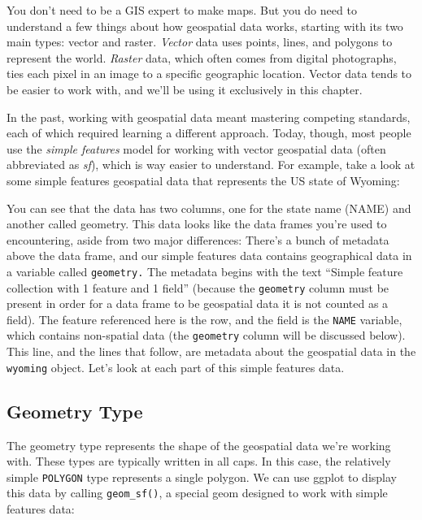 \documentclass[
]{book}
\begin{document}
You don't need to be a GIS expert to make maps. But you do need to understand a few things about how geospatial data works, starting with its two main types: vector and raster. \emph{Vector} data uses points, lines, and polygons to represent the world. \emph{Raster} data, which often comes from digital photographs, ties each pixel in an image to a specific geographic location. Vector data tends to be easier to work with, and we'll be using it exclusively in this chapter.

In the past, working with geospatial data meant mastering competing standards, each of which required learning a different approach. Today, though, most people use the \emph{simple features} model for working with vector geospatial data (often abbreviated as \emph{sf}), which is way easier to understand. For example, take a look at some simple features geospatial data that represents the US state of Wyoming:

You can see that the data has two columns, one for the state name (NAME) and another called geometry. This data looks like the data frames you're used to encountering, aside from two major differences: There's a bunch of metadata above the data frame, and our simple features data contains geographical data in a variable called \texttt{geometry.} The metadata begins with the text ``Simple feature collection with 1 feature and 1 field'' (because the \texttt{geometry} column must be present in order for a data frame to be geospatial data it is not counted as a field). The feature referenced here is the row, and the field is the \texttt{NAME} variable, which contains non-spatial data (the \texttt{geometry} column will be discussed below). This line, and the lines that follow, are metadata about the geospatial data in the \texttt{wyoming} object. Let's look at each part of this simple features data.

\hypertarget{geometry-type}{%
\subsection*{Geometry Type}\label{geometry-type}}

The geometry type represents the shape of the geospatial data we're working with. These types are typically written in all caps. In this case, the relatively simple \texttt{POLYGON} type represents a single polygon. We can use ggplot to display this data by calling \texttt{geom\_sf()}, a special geom designed to work with simple features data:
\end{document}
